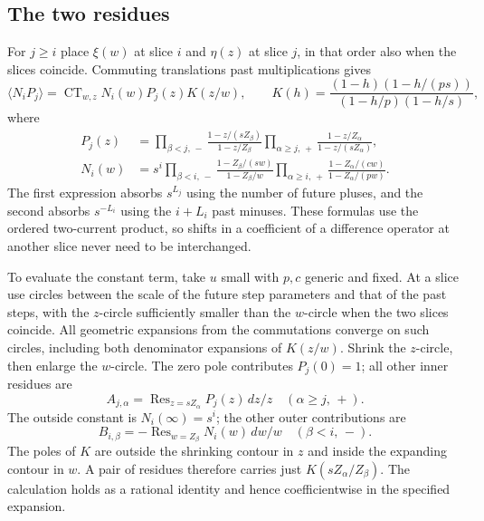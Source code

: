 \subsection{The two residues}

For \(j\ge i\) place \(\xi(w)\) at slice \(i\) and \(\eta(z)\) at slice \(j\), in that order also when the slices coincide. Commuting translations past multiplications gives
\[
 \langle N_i P_j\rangle=\operatorname{CT}_{w,z}
     N_i(w)P_j(z)K(z/w),\qquad
 K(h)=\frac{(1-h)(1-h/(ps))}{(1-h/p)(1-h/s)} ,
\]
where
\begin{equation}
\begin{split}
 P_j(z)&=\prod_{\beta<j,\,-}\frac{1-z/(sZ_\beta)}{1-z/Z_\beta}
          \prod_{\alpha\ge j,\,+}\frac{1-z/Z_\alpha}{1-z/(sZ_\alpha)},\\
 N_i(w)&=s^i\prod_{\beta<i,\,-}\frac{1-Z_\beta/(sw)}{1-Z_\beta/w}
          \prod_{\alpha\ge i,\,+}\frac{1-Z_\alpha/(cw)}{1-Z_\alpha/(pw)} .
\end{split}
 \label{eq:wick}
\end{equation}
The first expression absorbs \(s^{L_j}\) using the number of future pluses, and the second absorbs \(s^{-L_i}\) using the \(i+L_i\) past minuses. These formulas use the ordered two-current product, so shifts in a coefficient of a difference operator at another slice never need to be interchanged.

To evaluate the constant term, take \(u\) small with \(p,c\) generic and fixed. At a slice use circles between the scale of the future step parameters and that of the past steps, with the \(z\)-circle sufficiently smaller than the \(w\)-circle when the two slices coincide. All geometric expansions from the commutations converge on such circles, including both denominator expansions of \(K(z/w)\). Shrink the \(z\)-circle, then enlarge the \(w\)-circle. The zero pole contributes \(P_j(0)=1\); all other inner residues are
\[
 A_{j,\alpha}=\operatorname{Res}_{z=sZ_\alpha} P_j(z)\,dz/z
 \quad(\alpha\ge j,\,+).
\]
The outside constant is \(N_i(\infty)=s^i\); the other outer contributions are
\[
 B_{i,\beta}=-\operatorname{Res}_{w=Z_\beta} N_i(w)\,dw/w
 \quad(\beta<i,\,-).
\]
The poles of \(K\) are outside the shrinking contour in \(z\) and inside the expanding contour in \(w\). A pair of residues therefore carries just \(K(sZ_\alpha/Z_\beta)\). The calculation holds as a rational identity and hence coefficientwise in the specified expansion.

